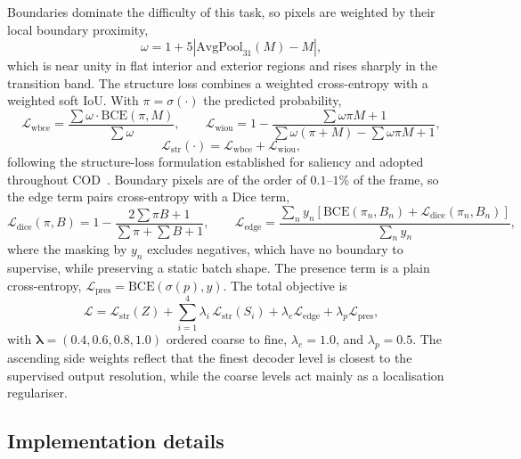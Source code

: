 \documentclass[3p,times,procedia]{elsarticle}
\begin{document}
Boundaries dominate the difficulty of this task, so pixels are weighted by their local boundary proximity,
\begin{equation}
\omega = 1 + 5\left|\mathrm{AvgPool}_{31}(M) - M\right| ,
\end{equation}
which is near unity in flat interior and exterior regions and rises sharply in the transition band. The structure loss combines a weighted cross-entropy with a weighted soft IoU. With $\pi = \sigma(\cdot)$ the predicted probability,
\begin{equation}
\mathcal{L}_{\mathrm{wbce}} = \frac{\sum \omega \cdot \mathrm{BCE}(\pi, M)}{\sum \omega},
\qquad
\mathcal{L}_{\mathrm{wiou}} = 1 - \frac{\sum \omega \pi M + 1}{\sum \omega (\pi + M) - \sum \omega \pi M + 1},
\end{equation}
\begin{equation}
\mathcal{L}_{\mathrm{str}}(\cdot) = \mathcal{L}_{\mathrm{wbce}} + \mathcal{L}_{\mathrm{wiou}} ,
\end{equation}
following the structure-loss formulation established for saliency and adopted throughout COD~\cite{f3net}. Boundary pixels are of the order of $0.1$--$1\%$ of the frame, so the edge term pairs cross-entropy with a Dice term,
\begin{equation}
\mathcal{L}_{\mathrm{dice}}(\pi, B) = 1 - \frac{2\sum \pi B + 1}{\sum \pi + \sum B + 1},
\qquad
\mathcal{L}_{\mathrm{edge}} = \frac{\sum_{n} y_n\left[\mathrm{BCE}(\pi_n, B_n) + \mathcal{L}_{\mathrm{dice}}(\pi_n, B_n)\right]}{\sum_{n} y_n},
\end{equation}
where the masking by $y_n$ excludes negatives, which have no boundary to supervise, while preserving a static batch shape. The presence term is a plain cross-entropy, $\mathcal{L}_{\mathrm{pres}} = \mathrm{BCE}(\sigma(p), y)$. The total objective is
\begin{equation}
\mathcal{L} = \mathcal{L}_{\mathrm{str}}(Z) + \sum_{i=1}^{4} \lambda_i \,\mathcal{L}_{\mathrm{str}}(S_i)
+ \lambda_e \mathcal{L}_{\mathrm{edge}} + \lambda_p \mathcal{L}_{\mathrm{pres}},
\label{eq:total}
\end{equation}
with $\boldsymbol{\lambda} = (0.4, 0.6, 0.8, 1.0)$ ordered coarse to fine, $\lambda_e = 1.0$, and $\lambda_p = 0.5$. The ascending side weights reflect that the finest decoder level is closest to the supervised output resolution, while the coarse levels act mainly as a localisation regulariser.

\subsection{Implementation details}
\end{document}
